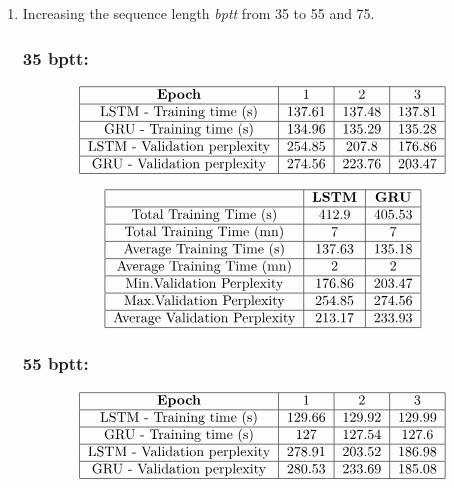 \documentclass[11pt]{article}
\newcommand{\0}{\mat{0}}
\begin{document}
\begin{itemize}
\begin{enumerate}
	\item Increasing the sequence length \textit{bptt} from 35 to 55 and 75.
	\subsubsection*{\textbf{35 bptt:}}
	  \[
  	 	\begin{tabular}{| c | c | c | c |}
  	 	 	\hline
	 	 		\textbf{Epoch} & 1 & 2 & 3  \\
	  	 	\hline
	 			LSTM - Training time (s)		& 137.61 & 137.48 & 137.81 \\
	 	 	\hline
				GRU - Training time (s)		& 134.96& 135.29 & 135.28 \\
			\hline 
				LSTM - Validation perplexity	& 254.85 & 207.8 & 176.86 \\
			\hline 
				GRU - Validation perplexity	& 274.56 & 223.76 & 203.47 \\
			\hline
		\end{tabular}
	\] 

	  \[
  	 	\begin{tabular}{| c | c | c |}
  	 	 	\hline
	 	 		& \textbf{LSTM} &  \textbf{GRU} \\
	  	 	\hline
	 			Total Training Time (s)		& 412.9 & 405.53 \\
	 	 	\hline
				Total Training Time (mn)		& 7 & 7 \\
			\hline 
				Average Training Time (s)	 	& 137.63 & 135.18 \\
			\hline 
				Average Training Time (mn)	& 2 & 2 \\
			\hline
				Min.Validation Perplexity		& 176.86 & 203.47 \\
			\hline
				Max.Validation Perplexity		& 254.85 & 274.56 \\
			\hline
				Average Validation Perplexity	& 213.17 & 233.93 \\
			\hline
		\end{tabular}
	\] 

	\subsubsection*{\textbf{55 bptt:}}
	  \[
  	 	\begin{tabular}{| c | c | c | c |}
  	 	 	\hline
	 	 		\textbf{Epoch} & 1 & 2 & 3  \\
	  	 	\hline
	 			LSTM - Training time (s)		& 129.66 & 129.92 & 129.99 \\
	 	 	\hline
				GRU - Training time (s)		& 127	& 127.54 & 127.6 \\
			\hline 
				LSTM - Validation perplexity	& 278.91	&  203.52 & 186.98\\
			\hline 
				GRU - Validation perplexity	& 280.53 & 233.69 & 185.08 \\
			\hline
		\end{tabular}
	\] 


\end{enumerate}
\end{itemize}
\end{document}
